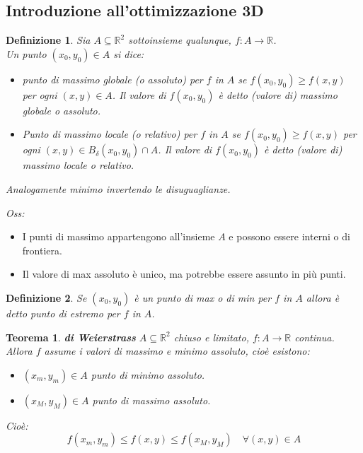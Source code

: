 \documentclass{scrreprt}
\newtheorem{defn}{Definizione}
\newenvironment{definition}{\begin{mdframed}[backgroundcolor=Ivory2]\begin{defn}}{\end{defn}\end{mdframed}}
\newtheorem{teorema}{Teorema}
\newenvironment{thm}{\begin{mdframed}[backgroundcolor=Ivory2]\begin{teorema}}{\end{teorema}\end{mdframed}}
\begin{document}

\subsection{Introduzione all'ottimizzazione 3D}
\begin{definition}
	Sia $A \subseteq \mathbb{R}^2$ sottoinsieme qualunque, $f: A \to \mathbb{R}$.\\
	Un punto $(x_0,y_0) \in A$ si dice:
	\begin{itemize}
		\item punto di massimo globale (o assoluto) per $f$ in $A$ se $f(x_0,y_0) \geq f(x,y)$ per ogni $(x,y) \in A$. Il valore di $f(x_0,y_0)$ è detto (valore di) massimo globale o assoluto.
		\item Punto di massimo locale (o relativo) per $f$ in $A$ se $f(x_0,y_0) \geq f(x,y)$ per ogni $(x,y) \in B_\delta (x_0,y_0) \cap A$. Il valore di $f(x_0,y_0)$ è detto (valore di) massimo locale o relativo.
		\end{itemize}
	Analogamente minimo invertendo le disuguaglianze.
\end{definition}
\emph{Oss:}\begin{itemize}
	\item I punti di massimo appartengono all'insieme $A$ e possono essere interni o di frontiera.
	\item Il valore di max assoluto è unico, ma potrebbe essere assunto in più punti.
\end{itemize}

\begin{definition}
	Se $(x_0,y_0)$ è un punto di max o di min per $f$ in $A$ allora è detto punto di estremo per $f$ in $A$.
\end{definition}

\begin{thm} \textbf{di Weierstrass}
	$A \subseteq \mathbb{R}^2$ chiuso e limitato, $f: A \to \mathbb{R}$ continua.\\
	Allora $f$ assume i valori di massimo e minimo assoluto, cioè esistono:
	\begin{itemize}
		\item $(x_m, y_m) \in A$ punto di minimo assoluto.
		\item $(x_M, y_M) \in A$ punto di massimo assoluto.
	\end{itemize}
	Cioè:
	\begin{equation}
		f(x_m, y_m) \leq f(x,y) \leq f(x_M, y_M) \quad \forall (x,y) \in A
	\end{equation}
\end{thm}
\end{document}
